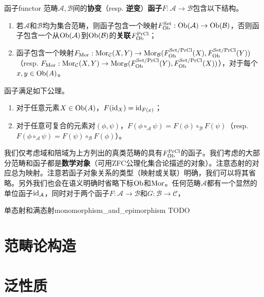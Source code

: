 \documentclass[../main.tex]{subfiles}
\begin{document}
\begin{definition}{函子}{functor}
范畴$\mathcal{A},\mathcal{B}$间的\textbf{协变}（resp. \textbf{逆变}）\textbf{函子}$F:\mathcal{A}\to\mathcal{B}$包含以下结构。
\begin{enumerate}
    \item 若$\mathcal{A}$和$\mathcal{B}$均为集合范畴，则函子包含一个映射$F_{\operatorname{Ob}}^{\text{Set}}:\operatorname{Ob}(\mathcal{A})\to\operatorname{Ob}(\mathcal{B})$，否则函子包含一个从$\operatorname{Ob}(\mathcal{A})$到$\operatorname{Ob}(\mathcal{B})$的\textbf{关联}$F_{\operatorname{Ob}}^{\text{PrCl}}$；
    \item 函子包含一个映射$F_{\operatorname{Mor}}:\operatorname{Mor}_\mathcal{C}(X,Y)\to\operatorname{Mor}_\mathcal{B}(F_{\operatorname{Ob}}^{\text{Set/PrCl}}(X),F_{\operatorname{Ob}}^{\text{Set/PrCl}}(Y))$\newline（resp. $F_{\operatorname{Mor}}:\operatorname{Mor}_\mathcal{C}(X,Y)\to\operatorname{Mor}_\mathcal{B}(F_{\operatorname{Ob}}^{\text{Set/PrCl}}(Y),F_{\operatorname{Ob}}^{\text{Set/PrCl}}(X))$），对于每个$x,y\in\operatorname{Ob}(A)$。
\end{enumerate}
函子满足如下公理。
\begin{enumerate}
    \item 对于任意元素$X\in\operatorname{Ob}(A)$，$F(\operatorname{id}_X)=\operatorname{id}_{F(x)}$；
    \item 对于任意可复合的元素对$(\phi,\psi)$，$F(\phi\circ_\mathcal{A}\psi)=F(\phi)\circ_\mathcal{B}F(\psi)$（resp. $F(\phi\circ_\mathcal{A}\psi)=F(\psi)\circ_\mathcal{B}F(\phi)$）。
\end{enumerate}
\end{definition}
我们仅考虑域和陪域为上方列出的真类范畴的具有$F_{\operatorname{Ob}}^{\text{PrCl}}$的函子。我们考虑的大部分范畴和函子都是\textbf{数学对象}（可用ZFC公理化集合论描述的对象）。注意态射的对应总为映射。注意若函子对象关系的类型（映射或关联）明确，我们可以将其省略。另外我们也会在语义明确时省略下标$\operatorname{Ob}$和$\operatorname{Mor}$。任何范畴$\mathcal{A}$都有一个显然的单位函子$\operatorname{id}_\mathcal{A}$，同时对于两个函子$F:\mathcal{A}\to\mathcal{B}$和$G:\mathcal{B}\to\mathcal{C}$，

\begin{definition}{单态射和满态射}{monomorphism_and_epimorphism}
TODO
\end{definition}


\section{范畴论构造}
\section{泛性质}
\biblio
\end{document}
